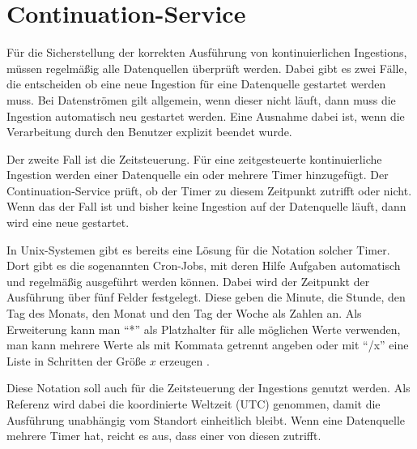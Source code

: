 \section{Continuation-Service}

Für die Sicherstellung der korrekten Ausführung von kontinuierlichen Ingestions, müssen regelmäßig alle Datenquellen überprüft werden.
Dabei gibt es zwei Fälle, die entscheiden ob eine neue Ingestion für eine Datenquelle gestartet werden muss.
Bei Datenströmen gilt allgemein, wenn dieser nicht läuft, dann muss die Ingestion automatisch neu gestartet werden.
Eine Ausnahme dabei ist, wenn die Verarbeitung durch den Benutzer explizit beendet wurde.

Der zweite Fall ist die Zeitsteuerung. 
Für eine zeitgesteuerte kontinuierliche Ingestion werden einer Datenquelle ein oder mehrere Timer hinzugefügt.
Der Continuation-Service prüft, ob der Timer zu diesem Zeitpunkt zutrifft oder nicht.
Wenn das der Fall ist und bisher keine Ingestion auf der Datenquelle läuft, dann wird eine neue gestartet.

In Unix-Systemen gibt es bereits eine Lösung für die Notation solcher Timer.
Dort gibt es die sogenannten Cron-Jobs, mit deren Hilfe Aufgaben automatisch und regelmäßig ausgeführt werden können.
Dabei wird der Zeitpunkt der Ausführung über fünf Felder festgelegt.
Diese geben die Minute, die Stunde, den Tag des Monats, den Monat und den Tag der Woche als Zahlen an.
Als Erweiterung kann man "`*"' als Platzhalter für alle möglichen Werte verwenden, man kann mehrere Werte als mit Kommata getrennt angeben oder mit "`/x"' eine Liste in Schritten der Größe $x$ erzeugen \parencite{cron}.

Diese Notation soll auch für die Zeitsteuerung der Ingestions genutzt werden.
Als Referenz wird dabei die koordinierte Weltzeit (UTC) genommen, damit die Ausführung unabhängig vom Standort einheitlich bleibt. 
Wenn eine Datenquelle mehrere Timer hat, reicht es aus, dass einer von diesen zutrifft.